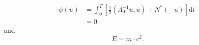 \begin{align}
  \psi (u) & = \int_{0}^{T} \left[\frac{1}{2}
  \left(\Lambda_{0}^{-1} u,u\right) + N^{\ast} (-u)\right] \text{d}t \; \\
& = 0
\end{align}
and 
\begin{equation}
  E = m\cdot c^2.
  \label{eq:important}
\end{equation}